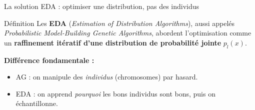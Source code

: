 \documentclass[10pt,aspectratio=169]{beamer}
\begin{document}
\begin{frame}{La solution EDA : optimiser une distribution, pas des individus}
\begin{block}{Définition}
Les \textbf{EDA} (\emph{Estimation of Distribution Algorithms}), aussi appelés \emph{Probabilistic Model-Building Genetic Algorithms}, abordent l'optimisation comme un \textbf{raffinement itératif d'une distribution de probabilité jointe} $p_l(x)$.
\end{block}

\vspace{0.3cm}
\textbf{Différence fondamentale :}
\begin{itemize}
  \item \textcolor{dangerred}{AG} : on manipule des \emph{individus} (chromosomes) par hasard.
  \item \textcolor{successgreen}{EDA} : on apprend \emph{pourquoi} les bons individus sont bons, puis on échantillonne.
\end{itemize}

\vspace{0.3cm}
\centering
{}
\end{frame}
\end{document}
